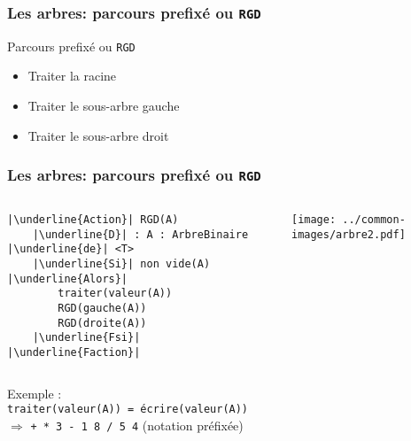 \documentclass[table,handout,tikz,12pt,svgnames]{beamer}
\begin{document}
\begin{frame}[fragile=singleslide]
	\frametitle{Les arbres: parcours prefixé ou \texttt{RGD}}
	\begin{block}{Parcours prefixé ou \texttt{RGD}}
		\begin{itemize}
			\item Traiter la racine
			\item Traiter le sous-arbre gauche
			\item Traiter le sous-arbre droit
		\end{itemize}
	\end{block}
\end{frame}


\begin{frame}[fragile=singleslide]
	\frametitle{Les arbres: parcours prefixé ou \texttt{RGD}}
	\begin{block}{}
		\begin{columns}[T]
			\begin{column}{0.7\textwidth}
				\begin{verbatim}
|\underline{Action}| RGD(A)
	|\underline{D}| : A : ArbreBinaire |\underline{de}| <T>
	|\underline{Si}| non vide(A) |\underline{Alors}|
		traiter(valeur(A))
		RGD(gauche(A))
		RGD(droite(A))
	|\underline{Fsi}|
|\underline{Faction}|

				\end{verbatim}
			\end{column}
			\hspace{-2.5cm}
			\hspace{0.2cm}
			\begin{column}{0.38\textwidth}
				\begin{flushright}
					{\texttt{[image: ../common-images/arbre2.pdf]}}
				\end{flushright}
			\end{column}
		\end{columns}
		\vspace{0.5cm}
		Exemple :\\ \texttt{traiter(valeur(A)) = écrire(valeur(A))}\\
		$\Rightarrow$ \texttt{+ * 3 - 1 8 / 5 4} (notation préfixée)
	\end{block}
\end{frame}
\end{document}
